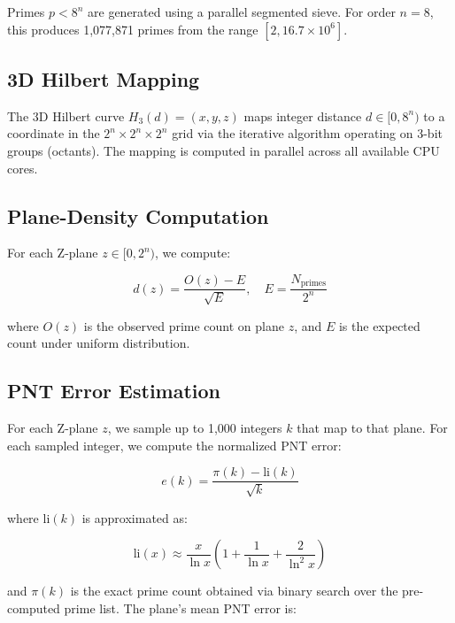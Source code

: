\documentclass[11pt,a4paper]{article}
\begin{document}
Primes $p < 8^n$ are generated using a parallel segmented sieve. For
order $n=8$, this produces 1,077,871 primes from the range $[2, 16.7
\times 10^6]$.

\subsection{3D Hilbert Mapping}

The 3D Hilbert curve $H_3(d) = (x,y,z)$ maps integer distance $d \in [0,
8^n)$ to a coordinate in the $2^n \times 2^n \times 2^n$ grid via the
iterative algorithm operating on 3-bit groups (octants). The mapping is
computed in parallel across all available CPU cores.

\subsection{Plane-Density Computation}

For each Z-plane $z \in [0, 2^n)$, we compute:

\begin{equation}
d(z) = \frac{O(z) - E}{\sqrt{E}}, \quad E = \frac{N_{\text{primes}}}{2^n}
\label{eq:density}
\end{equation}

where $O(z)$ is the observed prime count on plane $z$, and $E$ is the
expected count under uniform distribution.

\subsection{PNT Error Estimation}

For each Z-plane $z$, we sample up to 1,000 integers $k$ that map to
that plane. For each sampled integer, we compute the normalized PNT error:

\begin{equation}
e(k) = \frac{\pi(k) - \text{li}(k)}{\sqrt{k}}
\label{eq:pnt_error}
\end{equation}

where $\text{li}(k)$ is approximated as:

\begin{equation}
\text{li}(x) \approx \frac{x}{\ln x}\left(1 + \frac{1}{\ln x} +
\frac{2}{\ln^2 x}\right)
\label{eq:li_approx}
\end{equation}

and $\pi(k)$ is the exact prime count obtained via binary search over
the pre-computed prime list. The plane's mean PNT error is:
\end{document}
